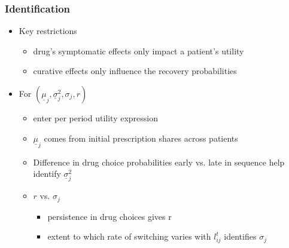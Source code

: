 \begin{frame}
\frametitle{Identification}

\begin{itemize}
\item Key restrictions

\begin{itemize}
\item drug's symptomatic effects only impact a patient's utility

\item curative effects only influence the recovery probabilities
\end{itemize}

\item For $(\underline{\mu }_{j},\underline{\sigma }_{j}^{2},\sigma _{j},r)$

\begin{itemize}
\item enter per period utility expression

\item $\underline{\mu }_{j}$ comes from initial prescription shares across
patients

\item Difference in drug choice probabilities early vs. late in sequence
help identify $\underline{\sigma }_{j}^{2}$

\item $r$ vs. $\sigma _{j}$

\begin{itemize}
\item persistence in drug choices gives r

\item extent to which rate of switching varies with $l_{ij}^{t}$ identifies $%
\sigma _{j}$
\end{itemize}
\end{itemize}
\end{itemize}
\end{frame}



